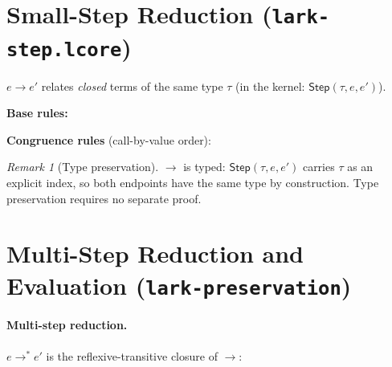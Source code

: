 \documentclass[10pt,a4paper]{article}
\newcommand{\IsVal}[2]{\mathsf{IsVal}(#1,\,#2)} %
\newcommand{\step}{\to}
\newcommand{\steps}{\to^{*}}
\newcommand{\subst}[2]{#1[#2]}
\newcommand{\envnil}{\langle\,\rangle}
\newcommand{\envcons}[2]{(#1;\,#2)}
\newcommand{\klet}{\mathbf{let}}
\newcommand{\kin}{\mathbf{in}}
\newcommand{\kif}{\mathbf{if}}
\newcommand{\kthen}{\mathbf{then}}
\newcommand{\kelse}{\mathbf{else}}
\newcommand{\lfile}[1]{\texttt{#1}}
\theoremstyle{plain}
\theoremstyle{definition}
\theoremstyle{remark}
\newtheorem{remark}{Remark}
\begin{document}
\section{Small-Step Reduction (\lfile{lark-step.lcore})}
\label{sec:step}

$e \step e'$ relates \emph{closed} terms of the same type $\tau$
(in the kernel: $\mathsf{Step}(\tau, e, e')$).

\medskip
\noindent\textbf{Base rules:}

\noindent\textbf{Congruence rules} (call-by-value order):

\begin{remark}[Type preservation]
$\step$ is typed: $\mathsf{Step}(\tau,e,e')$ carries $\tau$ as an
explicit index, so both endpoints have the same type by construction.
Type preservation requires no separate proof.
\end{remark}

\section{Multi-Step Reduction and Evaluation (\lfile{lark-preservation})}
\label{sec:preservation}

\paragraph{Multi-step reduction.}
$e \steps e'$ is the reflexive-transitive closure of $\step$:
\end{document}

